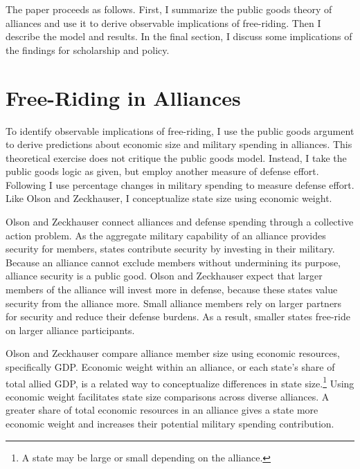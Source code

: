 \documentclass[12pt]{article}
\begin{document}
The paper proceeds as follows.
First, I summarize the public goods theory of alliances and use it to derive observable implications of free-riding.
Then I describe the model and results. 
In the final section, I discuss some implications of the findings for scholarship and policy. 



\section{Free-Riding in Alliances}

To identify observable implications of free-riding, I use the public goods argument to derive predictions about economic size and military spending in alliances.
This theoretical exercise does not critique the public goods model.
Instead, I take the public goods logic as given, but employ another measure of defense effort. 
Following \citet{PluemperNeumayer2015} I use percentage changes in military spending to measure defense effort.
Like Olson and Zeckhauser, I conceptualize state size using economic weight. 


Olson and Zeckhauser connect alliances and defense spending through a collective action problem. 
As the aggregate military capability of an alliance provides security for members, states contribute security by investing in their military.
Because an alliance cannot exclude members without undermining its purpose, alliance security is a public good. 
Olson and Zeckhauser expect that larger members of the alliance will invest more in defense, because these states value security from the alliance more.
Small alliance members rely on larger partners for security and reduce their defense burdens.
As a result, smaller states free-ride on larger alliance participants. 


Olson and Zeckhauser compare alliance member size using economic resources, specifically GDP.
Economic weight within an alliance, or each state's share of total allied GDP, is a related way to conceptualize differences in state size.\footnote{A state may be large or small depending on the alliance.} 
Using economic weight facilitates state size comparisons across diverse alliances. 
A greater share of total economic resources in an alliance gives a state more economic weight and increases their potential military spending contribution. 
\end{document}
